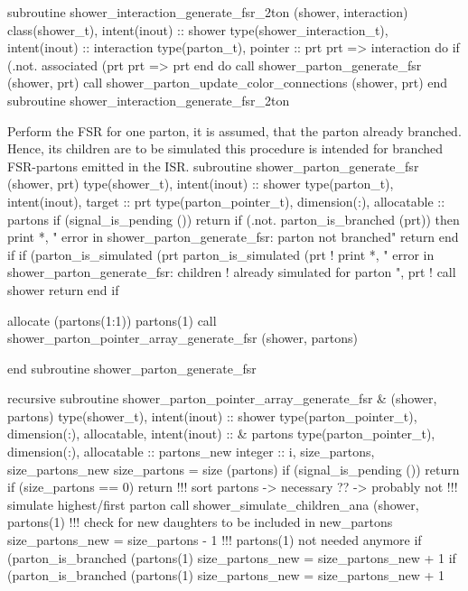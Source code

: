   subroutine shower_interaction_generate_fsr_2ton (shower, interaction)
    class(shower_t), intent(inout) :: shower
    type(shower_interaction_t), intent(inout) :: interaction
    type(parton_t), pointer :: prt
    prt => interaction%
    do
       if (.not. associated (prt%
       prt => prt%
    end do
    call shower_parton_generate_fsr (shower, prt)
    call shower_parton_update_color_connections (shower, prt)
  end subroutine shower_interaction_generate_fsr_2ton

\eatline
\nwendcode{} Perform the FSR for one parton, it is assumed, that the parton
already branched. Hence, its children are to be simulated this procedure is
intended for branched FSR-partons emitted in the ISR.
\nwenddocs{}\plusendmoddef
  subroutine shower_parton_generate_fsr (shower, prt)
    type(shower_t), intent(inout) :: shower
    type(parton_t), intent(inout), target :: prt
    type(parton_pointer_t), dimension(:), allocatable :: partons
    if (signal_is_pending ()) return
    if (.not. parton_is_branched (prt)) then
       print *, " error in shower_parton_generate_fsr: parton not branched"
       return
    end if
    if (parton_is_simulated (prt%
        parton_is_simulated (prt%
       ! print *, " error in shower_parton_generate_fsr: children
       !       already simulated for parton ", prt%
       ! call shower%
       return
    end if

    allocate (partons(1:1))
    partons(1)%
    call shower_parton_pointer_array_generate_fsr (shower, partons)

  end subroutine shower_parton_generate_fsr

\eatline
\nwendcode{}\nwdocspar
\nwenddocs{}\plusendmoddef
    recursive subroutine shower_parton_pointer_array_generate_fsr &
         (shower, partons)
      type(shower_t), intent(inout) :: shower
      type(parton_pointer_t), dimension(:), allocatable, intent(inout) :: &
           partons
      type(parton_pointer_t), dimension(:), allocatable :: partons_new
      integer :: i, size_partons, size_partons_new
      size_partons = size (partons)
      if (signal_is_pending ()) return
      if (size_partons == 0) return
      !!! sort partons -> necessary ?? -> probably not
      !!! simulate highest/first parton
      call shower_simulate_children_ana (shower, partons(1)%
      !!! check for new daughters to be included in new_partons
      size_partons_new = size_partons - 1   !!! partons(1) not needed anymore
      if (parton_is_branched (partons(1)%
           size_partons_new = size_partons_new + 1
      if (parton_is_branched (partons(1)%
           size_partons_new = size_partons_new + 1

